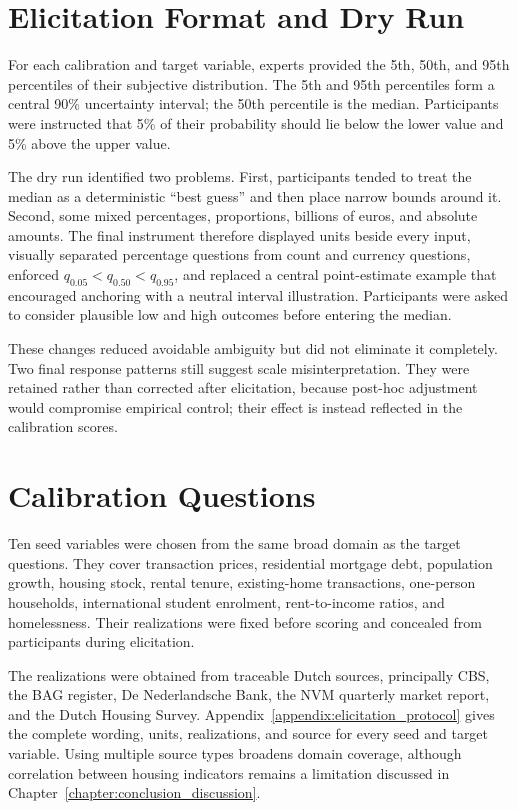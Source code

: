\section{Elicitation Format and Dry Run}
\label{sec:elicitation_format}

For each calibration and target variable, experts provided the 5th, 50th, and 95th percentiles of their subjective distribution. The 5th and 95th percentiles form a central 90\% uncertainty interval; the 50th percentile is the median. Participants were instructed that 5\% of their probability should lie below the lower value and 5\% above the upper value.

The dry run identified two problems. First, participants tended to treat the median as a deterministic ``best guess'' and then place narrow bounds around it. Second, some mixed percentages, proportions, billions of euros, and absolute amounts. The final instrument therefore displayed units beside every input, visually separated percentage questions from count and currency questions, enforced $q_{0.05}<q_{0.50}<q_{0.95}$, and replaced a central point-estimate example that encouraged anchoring with a neutral interval illustration. Participants were asked to consider plausible low and high outcomes before entering the median.

These changes reduced avoidable ambiguity but did not eliminate it completely. Two final response patterns still suggest scale misinterpretation. They were retained rather than corrected after elicitation, because post-hoc adjustment would compromise empirical control; their effect is instead reflected in the calibration scores.

\section{Calibration Questions}
\label{sec:calibration_questions}

Ten seed variables were chosen from the same broad domain as the target questions. They cover transaction prices, residential mortgage debt, population growth, housing stock, rental tenure, existing-home transactions, one-person households, international student enrolment, rent-to-income ratios, and homelessness. Their realizations were fixed before scoring and concealed from participants during elicitation.

The realizations were obtained from traceable Dutch sources, principally CBS, the BAG register, De Nederlandsche Bank, the NVM quarterly market report, and the Dutch Housing Survey. Appendix~\ref{appendix:elicitation_protocol} gives the complete wording, units, realizations, and source for every seed and target variable. Using multiple source types broadens domain coverage, although correlation between housing indicators remains a limitation discussed in Chapter~\ref{chapter:conclusion_discussion}.
